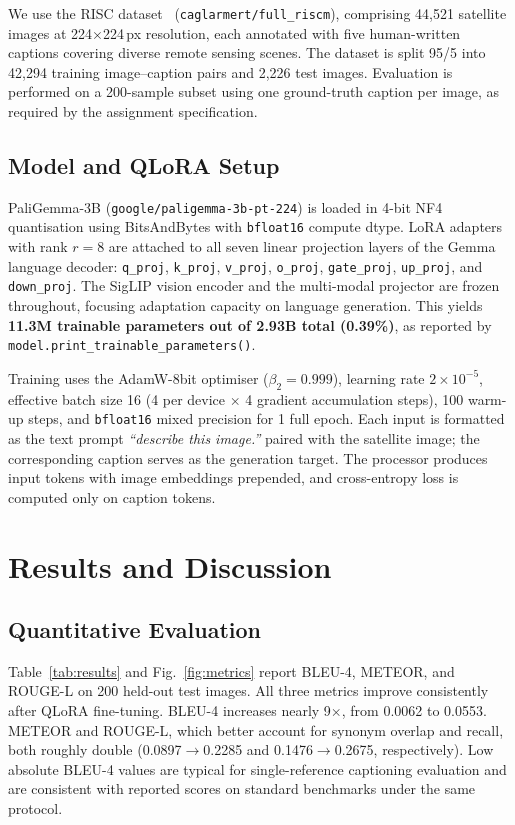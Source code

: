 \documentclass[conference]{IEEEtran}
\begin{document}
We use the RISC dataset~\cite{riscdata} (\texttt{caglarmert/full\_riscm}),
comprising 44,521 satellite images at 224$\times$224\,px resolution,
each annotated with five human-written captions covering diverse remote sensing scenes.
The dataset is split 95/5 into 42,294 training image--caption pairs and 2,226 test images.
Evaluation is performed on a 200-sample subset using one ground-truth caption per image,
as required by the assignment specification.

\subsection{Model and QLoRA Setup}

PaliGemma-3B (\texttt{google/paligemma-3b-pt-224}) is loaded in 4-bit NF4
quantisation using BitsAndBytes with \texttt{bfloat16} compute dtype.
LoRA adapters with rank $r\!=\!8$ are attached to all seven
linear projection layers of the Gemma language decoder:
\texttt{q\_proj}, \texttt{k\_proj}, \texttt{v\_proj}, \texttt{o\_proj},
\texttt{gate\_proj}, \texttt{up\_proj}, and \texttt{down\_proj}.
The SigLIP vision encoder and the multi-modal projector are frozen throughout,
focusing adaptation capacity on language generation.
This yields \textbf{11.3M trainable parameters out of 2.93B total (0.39\%)},
as reported by \texttt{model.print\_trainable\_parameters()}.

Training uses the AdamW-8bit optimiser ($\beta_2\!=\!0.999$),
learning rate $2\!\times\!10^{-5}$,
effective batch size 16 (4 per device $\times$ 4 gradient accumulation steps),
100 warm-up steps, and \texttt{bfloat16} mixed precision for 1 full epoch.
Each input is formatted as the text prompt \textit{``describe this image.''}
paired with the satellite image; the corresponding caption serves as the generation target.
The processor produces input tokens with image embeddings prepended,
and cross-entropy loss is computed only on caption tokens.

\section{Results and Discussion}

\subsection{Quantitative Evaluation}

Table~\ref{tab:results} and Fig.~\ref{fig:metrics} report BLEU-4, METEOR, and ROUGE-L
on 200 held-out test images.
All three metrics improve consistently after QLoRA fine-tuning.
BLEU-4 increases nearly 9$\times$, from 0.0062 to 0.0553.
METEOR and ROUGE-L, which better account for synonym overlap and recall,
both roughly double (0.0897$\to$0.2285 and 0.1476$\to$0.2675, respectively).
Low absolute BLEU-4 values are typical for single-reference captioning evaluation
and are consistent with reported scores on standard benchmarks under the same protocol.
\end{document}
